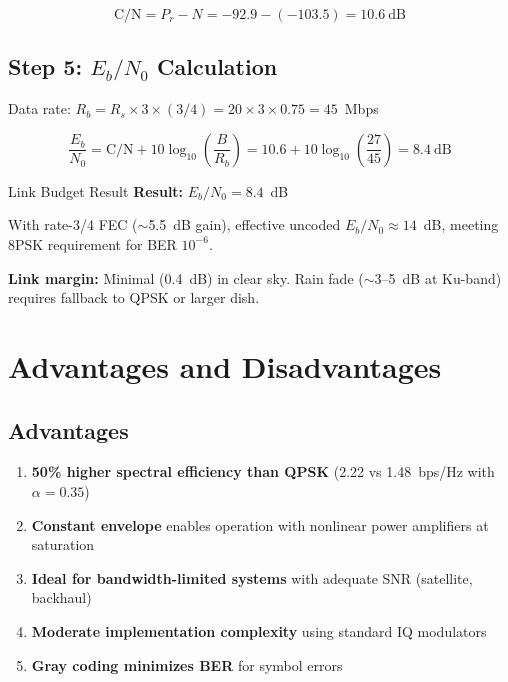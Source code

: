 \begin{equation}
\mathrm{C/N} = P_r - N = -92.9 - (-103.5) = 10.6~\text{dB}
\end{equation}

\subsection*{Step 5: $E_b/N_0$ Calculation}

Data rate: $R_b = R_s \times 3 \times (3/4) = 20 \times 3 \times 0.75 = 45$~Mbps

\begin{equation}
\frac{E_b}{N_0} = \mathrm{C/N} + 10\log_{10}\left(\frac{B}{R_b}\right) = 10.6 + 10\log_{10}\left(\frac{27}{45}\right) = 8.4~\text{dB}
\end{equation}

\begin{calloutbox}[colback=black!8!white,colframe=black]{Link Budget Result}
\textbf{Result:} $E_b/N_0 = 8.4$~dB

With rate-3/4 FEC ($\sim$5.5~dB gain), effective uncoded $E_b/N_0 \approx 14$~dB, meeting 8PSK requirement for BER $10^{-6}$.

\textbf{Link margin:} Minimal (0.4~dB) in clear sky. Rain fade ($\sim$3--5~dB at Ku-band) requires fallback to QPSK or larger dish.
\end{calloutbox}

\section{Advantages and Disadvantages}

\subsection*{Advantages}

\begin{enumerate}
\item \textbf{50\% higher spectral efficiency than QPSK} (2.22 vs 1.48~bps/Hz with $\alpha = 0.35$)
\item \textbf{Constant envelope} enables operation with nonlinear power amplifiers at saturation
\item \textbf{Ideal for bandwidth-limited systems} with adequate SNR (satellite, backhaul)
\item \textbf{Moderate implementation complexity} using standard IQ modulators
\item \textbf{Gray coding minimizes BER} for symbol errors
\end{enumerate}

